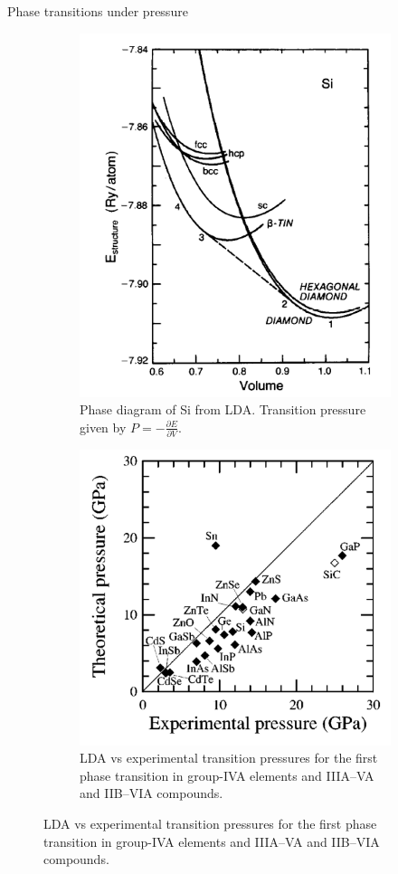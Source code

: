 \documentclass[aspectratio=169]{beamer}
\begin{document}
    \begin{frame}{Phase transitions under pressure}

        \begin{figure}
            \centering
            \begin{subfigure}{0.45\textwidth}
                \centering
                \includegraphics[width=0.7\linewidth]{lectures/figures/5_phase_diagram_si.png}
                \caption{Phase diagram of Si from LDA.\cite{yinTheoryStaticStructural1982} Transition pressure given by $P = -\frac{\partial E}{\partial V}$.}
            \end{subfigure}
            \begin{subfigure}{0.45\textwidth}
                \centering
                \includegraphics[width=0.8\linewidth]{lectures/figures/8_phase_transition_pressure_III_V_and_II-VI.png}
                \caption{LDA vs experimental transition pressures for the first phase transition in group-IVA elements and IIIA–VA and IIB–VIA compounds.\cite{mujicaHighpressurePhasesGroupIV2003}}
            \end{subfigure}
        \end{figure}

    \end{frame}
\end{document}
